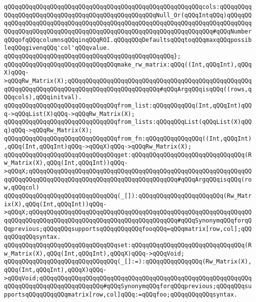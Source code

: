 \verb|qQQqqQQqqQQqqQQqqQQqqQQqqQQqqQQqqQQqqQQqqQQqqQQqqQQqqQQqcols:qQQqqQQqqQQqqQQqqQQqqQQqqQQqqQQqqQQqqQQqqQQqqQQqqQQqNull_Or(qQQqIntqQQq)qQQqqQQqqQQqqQQqqQQqqQQqqQQqqQQqqQQqqQQqqQQqqQQqqQQqqQQqqQQqqQQqqQQqqQQqqQQqqQQqqQQqqQQqqQQqqQQqqQQqqQQqqQQqqQQqqQQqqQQqqQQqqQQqqQQqqQQq#qQQqNumberqQQqofqQQqcolumnsqQQqinqQQqROI.qQQqqQQqDefaultsqQQqtoqQQqmaxqQQqpossibleqQQqgivenqQQq'col'qQQqvalue.|\newline
\verb|qQQqqQQqqQQqqQQqqQQqqQQqqQQqqQQqqQQqqQQqqQQqqQQq};|\newline
\newline
\verb|qQQqqQQqqQQqqQQqqQQqqQQqqQQqqQQqmake_rw_matrix:qQQq((Int,qQQqInt),qQQqX)qQQq->qQQqRw_Matrix(X);qQQqqQQqqQQqqQQqqQQqqQQqqQQqqQQqqQQqqQQqqQQqqQQqqQQqqQQqqQQqqQQqqQQqqQQqqQQqqQQqqQQqqQQqqQQqqQQq#qQQqArgqQQqisqQQq((rows,qQQqcols),qQQqinitval).|\newline
\newline
\verb|qQQqqQQqqQQqqQQqqQQqqQQqqQQqqQQqfrom_list:qQQqqQQqqQQq(Int,qQQqInt)qQQq->qQQqList(X)qQQq->qQQqRw_Matrix(X);|\newline
\verb|qQQqqQQqqQQqqQQqqQQqqQQqqQQqqQQqfrom_lists:qQQqqQQqList(qQQqList(X)qQQq)qQQq->qQQqRw_Matrix(X);|\newline
\verb|qQQqqQQqqQQqqQQqqQQqqQQqqQQqqQQqfrom_fn:qQQqqQQqqQQqqQQq((Int,qQQqInt),qQQq(Int,qQQqInt)qQQq->qQQqX)qQQq->qQQqRw_Matrix(X);|\newline
\newline
\verb|qQQqqQQqqQQqqQQqqQQqqQQqqQQqqQQqget:qQQqqQQqqQQqqQQqqQQqqQQqqQQqqQQq(Rw_Matrix(X),qQQq(Int,qQQqInt))qQQq->qQQqX;qQQqqQQqqQQqqQQqqQQqqQQqqQQqqQQqqQQqqQQqqQQqqQQqqQQqqQQqqQQqqQQqqQQqqQQqqQQqqQQqqQQqqQQqqQQqqQQqqQQqqQQqqQQqqQQq#qQQqArgqQQqisqQQq(row,qQQqcol)|\newline
\verb|qQQqqQQqqQQqqQQqqQQqqQQqqQQqqQQq(_[]):qQQqqQQqqQQqqQQqqQQqqQQq(Rw_Matrix(X),qQQq(Int,qQQqInt))qQQq->qQQqX;qQQqqQQqqQQqqQQqqQQqqQQqqQQqqQQqqQQqqQQqqQQqqQQqqQQqqQQqqQQqqQQqqQQqqQQqqQQqqQQqqQQqqQQqqQQqqQQqqQQqqQQqqQQqqQQq#qQQqSynonymqQQqforqQQqprevious;qQQqqQQqsupportsqQQqqQQqqQQqfooqQQq=qQQqmatrix[row,col];qQQqqQQqqQQqsyntax.|\newline
\newline
\verb|qQQqqQQqqQQqqQQqqQQqqQQqqQQqqQQqset:qQQqqQQqqQQqqQQqqQQqqQQqqQQqqQQq(Rw_Matrix(X),qQQq(Int,qQQqInt),qQQqX)qQQq->qQQqVoid;|\newline
\verb|qQQqqQQqqQQqqQQqqQQqqQQqqQQqqQQq(_[]:=):qQQqqQQqqQQqqQQq(Rw_Matrix(X),qQQq(Int,qQQqInt),qQQqX)qQQq->qQQqVoid;qQQqqQQqqQQqqQQqqQQqqQQqqQQqqQQqqQQqqQQqqQQqqQQqqQQqqQQqqQQqqQQqqQQqqQQqqQQqqQQqqQQqqQQq#qQQqSynonymqQQqforqQQqprevious;qQQqqQQqsupportsqQQqqQQqqQQqmatrix[row,col]qQQq:=qQQqfoo;qQQqqQQqqQQqsyntax.|\newline
